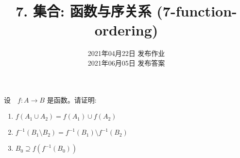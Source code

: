 \documentclass[a4paper, justified]{tufte-handout}
\title{7. 集合: 函数与序关系 (7-function-ordering)}
\date{2021年04月22日 发布作业 \\ 2021年06月05日 发布答案}
\begin{document}
\maketitle
\noplagiarism %
\begin{abstract}
\end{abstract}
\beginrequired

\begin{problem}[\score{7 = 2 + 2 + 3} $\star\star$]
  设　$f: A \to B$ 是函数。请证明:
  \begin{enumerate}[(1)]
    \item $f(A_1 \cup A_2) = f(A_1) \cup f(A_2)$
    \item $f^{-1}(B_1 \setminus B_2) = f^{-1}(B_1) \setminus f^{-1}(B_2)$
    \item $B_0 \supseteq f(f^{-1}(B_0))$
  \end{enumerate}
\end{problem}
\end{document}
